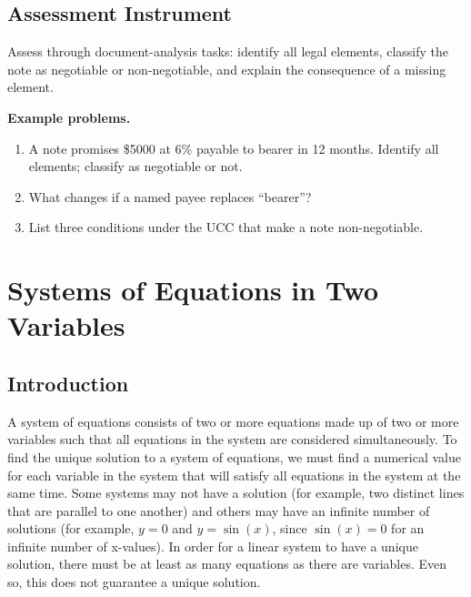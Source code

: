 \subsection{Assessment Instrument}
\label{ssec:asse-3669}


Assess through document-analysis tasks: identify all legal elements,
classify the note as negotiable or non-negotiable, and explain the
consequence of a missing element.

\textbf{Example problems.}
\begin{enumerate}
    \item A note promises \$5000 at 6\% payable to bearer in 12 months.
          Identify all elements; classify as negotiable or not.
    \item What changes if a named payee replaces ``bearer''?
    \item List three conditions under the UCC that make a note
          non-negotiable.
\end{enumerate}



\section{Systems of Equations in Two Variables}
\label{sec:syst-660c}



\subsection{Introduction}
\label{sss:intr-8800}




A system of equations consists of two or more equations made up of two or more variables
such that all equations in the system are considered simultaneously. To find the unique
solution to a system of equations, we must find a numerical value for each variable in the
system that will satisfy all equations in the system at the same time. Some systems may
not have a solution (for example, two distinct lines that are parallel to one another) and
others may have an infinite number of solutions (for example, $y = 0$ and $y = \sin(x)$,
since $\sin(x) = 0$ for an infinite number of x-values). In order for a linear system to
have a unique solution, there must be at least as many equations as there are variables.
Even so, this does not guarantee a unique solution.




